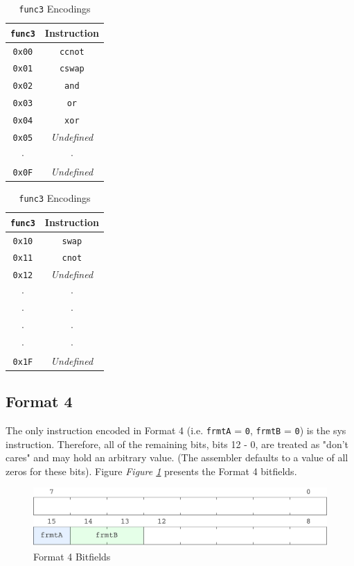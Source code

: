 \documentclass[sigconf, nonacm=true, screen=true]{acmart}
\begin{document}
\begin{center}
    \begin{table}[h]
        \begin{tabular}[t]{cc}
            \toprule
            \texttt{func3} & Instruction \\
            \midrule
            \texttt{0x00} & \texttt{ccnot} \\
            \texttt{0x01} & \texttt{cswap} \\
            \texttt{0x02} & \texttt{and} \\
            \texttt{0x03} & \texttt{or} \\
            \texttt{0x04} & \texttt{xor} \\
            \texttt{0x05} & \textit{Undefined} \\
            \(\cdot\) & \(\cdot\) \\
            \texttt{0x0F} & \textit{Undefined} \\
            \bottomrule
        \end{tabular}
        \begin{tabular}[t]{cc}
            \toprule
            \texttt{func3} & Instruction \\
            \midrule
            \texttt{0x10} & \texttt{swap} \\
            \texttt{0x11} & \texttt{cnot} \\
            \texttt{0x12} & \textit{Undefined} \\
            \(\cdot\) & \(\cdot\) \\
            \(\cdot\) & \(\cdot\) \\
            \(\cdot\) & \(\cdot\) \\
            \(\cdot\) & \(\cdot\) \\
            \texttt{0x1F} & \textit{Undefined} \\
            \bottomrule
        \end{tabular}
        \caption{\texttt{func3} Encodings}
        \label{table:func3-encodings}
    \end{table}
\end{center}


\subsection{Format 4}
The only instruction encoded in Format 4 (i.e. \texttt{frmtA} = \texttt{0}, \texttt{frmtB} = \texttt{0}) is the sys instruction. Therefore, all of the remaining bits, bits 12 - 0, are treated as "don't cares" and may hold an arbitrary value. (The assembler defaults to a value of all zeros for these bits). Figure \textit{Figure \ref{figure:format4-bitfields}} presents the Format 4 bitfields. 

\begin{figure}[h]
    \includegraphics[width=\columnwidth]{bitfields/format4_2-lane.pdf}
    \caption{Format 4 Bitfields}
    \label{figure:format4-bitfields}
\end{figure}
\end{document}
